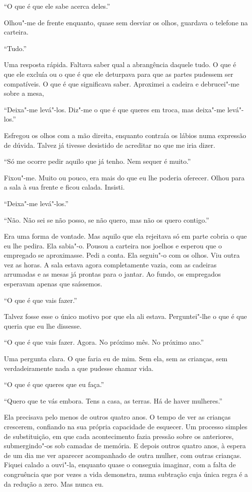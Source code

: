 ``O que é que ele sabe acerca deles.''

Olhou"-me de frente enquanto, quase sem desviar os olhos, guardava o
telefone na carteira.

``Tudo.''

Uma resposta rápida. Faltava saber qual a abrangência daquele tudo. O
que é que ele excluía ou o que é que ele deturpava para que as partes
pudessem ser compatíveis. O que é que significava saber. Aproximei a
cadeira e debrucei"-me sobre a mesa,

``Deixa"-me levá"-los. Diz"-me o que é que queres em troca, mas deixa"-me
levá"-los.''

Esfregou os olhos com a mão direita, enquanto contraía os lábios numa
expressão de dúvida. Talvez já tivesse desistido de acreditar no que me
iria dizer.

``Só me ocorre pedir aquilo que já tenho. Nem sequer é muito.''

Fixou"-me. Muito ou pouco, era mais do que eu lhe poderia oferecer.
Olhou para a sala à sua frente e ficou calada. Insisti.

``Deixa"-me levá"-los.''

``Não. Não sei se não posso, se não quero, mas não os quero contigo.''

Era uma forma de vontade. Mas aquilo que ela rejeitava só em parte
cobria o que eu lhe pedira. Ela sabia"-o. Pousou a carteira nos joelhos
e esperou que o empregado se aproximasse. Pedi a conta. Ela seguiu"-o
com os olhos. Viu outra vez as horas. A sala estava agora completamente
vazia, com as cadeiras arrumadas e as mesas já prontas para o jantar. Ao
fundo, os empregados esperavam apenas que saíssemos.

``O que é que vais fazer.''

Talvez fosse esse o único motivo por que ela ali estava. Perguntei"-lhe
o que é que queria que eu lhe dissesse.

``O que é que vais fazer. Agora. No próximo mês. No próximo ano.''

Uma pergunta clara. O que faria eu de mim. Sem ela, sem as crianças, sem
verdadeiramente nada a que pudesse chamar vida.

``O que é que queres que eu faça.''

``Quero que te vás embora. Tens a casa, as terras. Há de haver
mulheres.''

Ela precisava pelo menos de outros quatro anos. O tempo de ver as
crianças crescerem, confiando na sua própria capacidade de esquecer. Um
processo simples de substituição, em que cada acontecimento fazia
pressão sobre os anteriores, submergindo"-os sob camadas de memória. E
depois outros quatro anos, à espera de um dia me ver aparecer
acompanhado de outra mulher, com outras crianças. Fiquei calado a
ouvi"-la, enquanto quase o conseguia imaginar, com a falta de
congruência que por vezes a vida demonstra, numa subtração cuja única
regra é a da redução a zero. Mas nunca eu.

